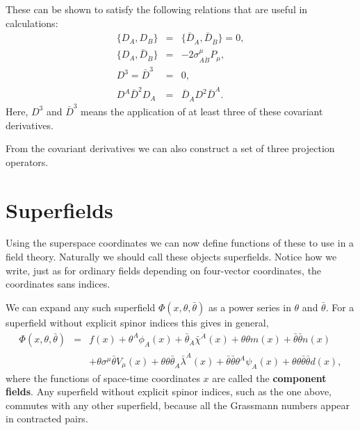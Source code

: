 \documentclass[notes.tex]{subfiles}
\begin{document}
These can be shown to satisfy the following relations that are useful in calculations:
\begin{eqnarray}
\{D_A, D_B\} &=& \{\bar{D}_{\dot{A}}, \bar{D}_{\dot{B}}\} = 0,\\
\{D_A, \bar{D}_{\dot{B}}\} &=& -2\sigma^\mu_{A\dot{B}}P_\mu, \label{eq:D2}\\
D^3 = \bar{D}^3&=&0 \label{eq:D3}, \\
D^A\bar{D}^2 D_A &=& \bar{D}_{\dot{A}}D^2\bar{D}^{\dot{A}}.
\end{eqnarray}
Here, $D^3$ and $\bar D^3$ means the application of at least three of these covariant derivatives.

From the covariant derivatives we can also construct  a set of three projection operators.



\section{Superfields}
Using the superspace coordinates we can now define functions of these to use in a field theory. Naturally we should call these objects superfields.
Notice how we write, just as for ordinary fields depending on four-vector coordinates, the coordinates sans indices. 

We can expand any such superfield $\Phi(x, \theta, \bar{\theta})$  as a power series in $\theta$ and $\bar{\theta}$. For a superfield without explicit spinor indices this gives in general,
\begin{eqnarray}
\Phi(x, \theta, \bar{\theta}) &=& f(x) + \theta^A\phi_A(x) + \bar{\theta}_{\dot{A}}\bar{\chi}^{\dot{A}}(x) + \theta\theta m(x) + \bar{\theta}\bar{\theta}n(x) \nonumber\\ 
&& + \theta \sigma^\mu \bar{\theta}V_\mu(x) + \theta \theta \bar{\theta}_{\dot{A}}\bar{\lambda}^{\dot{A}}(x) +\bar{\theta}\bar{\theta}\theta^A\psi_A(x) + \theta\theta\bar{\theta}\bar{\theta}d(x),\label{eq:gen_sup}
\end{eqnarray} 
where the functions of space-time coordinates $x$ are called the {\bf component fields}. Any superfield without explicit spinor indices, such as the one above, commutes with any other superfield, because all the Grassmann numbers appear in contracted pairs. 
\end{document}
